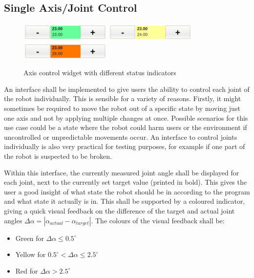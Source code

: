 \subsection{Single Axis/Joint Control}
\label{sec:conc:axiscontrol}
\begin{figure}
	\caption{\label{fig:axiscontrol}Axis control widget with different status indicators}
	\includegraphics[width=0.4\textwidth]{assets/chpt_concepts/AxisControlGreen}
	\includegraphics[width=0.4\textwidth]{assets/chpt_concepts/AxisControlYellow}
	\includegraphics[width=0.4\textwidth]{assets/chpt_concepts/AxisControlRed}
\end{figure}

An interface shall be implemented to give users the ability to control each joint of the robot individually. This is sensible for a variety of reasons. Firstly, it might sometimes be required to move the robot out of a specific state by moving just one axis and not by applying multiple changes at once. Possible scenarios for this use case could be a state where the robot could harm users or the environment if uncontrolled or unpredictable movements occur. An interface to control joints individually is also very practical for testing purposes, for example if one part of the robot is suspected to be broken.

Within this interface, the currently measured joint angle shall be displayed for each joint, next to the currently set target value (printed in bold). This gives the user a good insight of what state the robot should be in according to the program and what state it actually is in. This shall be supported by a coloured indicator, giving a quick visual feedback on the difference of the target and actual joint angles $\Delta \alpha = |\alpha_{actual} - \alpha_{target}|$. The colours of the visual feedback shall be:

\begin{itemize}
	\item Green for $\Delta\alpha \leq 0.5^\circ$
	\item Yellow for $0.5^\circ < \Delta\alpha \leq 2.5^\circ$
	\item Red for $\Delta\alpha > 2.5^\circ$ 
\end{itemize}

